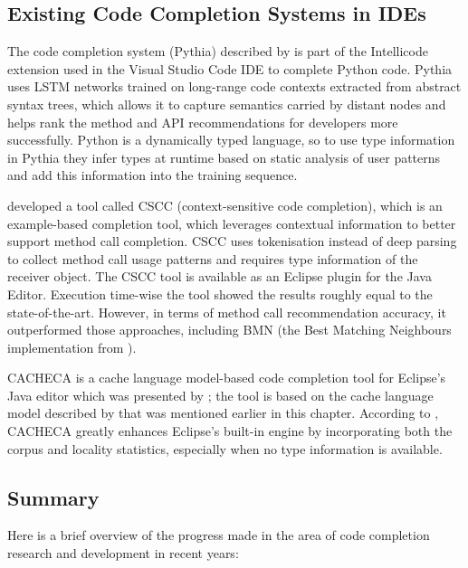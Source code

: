 \documentclass[sigplan,screen]{acmart}
\begin{document}
\subsection{Existing Code Completion Systems in IDEs}
The code completion system (Pythia) described by \cite{Svya19a} is part of the Intellicode extension used in the Visual Studio Code IDE to complete Python code. Pythia uses LSTM networks trained on long-range code contexts extracted from abstract syntax trees, which allows it to capture semantics carried by distant nodes and helps rank the method and API recommendations for developers more successfully. Python is a dynamically typed language, so to use type information in Pythia they infer types at runtime based on static analysis of user patterns and add this information into the training sequence.

\cite{Asad14a} developed a tool called CSCC (context-sensitive code completion), which is an example-based completion tool, which leverages contextual information to better support method call completion. CSCC uses tokenisation instead of deep parsing to collect method call usage patterns and requires type information of the receiver object. The CSCC tool is available as an Eclipse plugin for the Java Editor. Execution time-wise the tool showed the results roughly equal to the state-of-the-art. However, in terms of method call recommendation accuracy, it outperformed those approaches, including BMN (the Best Matching Neighbours implementation from \cite{Bruc09a}).

CACHECA is a cache language model-based code completion tool for Eclipse's Java editor which was presented by \cite{Fran15a}; the tool is based on the cache language model described by \cite{Tu14a} that was mentioned earlier in this chapter. According to \cite{Fran15a}, CACHECA greatly enhances Eclipse's built-in engine by incorporating both the corpus and locality statistics, especially when no type information is available.

\subsection{Summary}
Here is a brief overview of the progress made in the area of code completion research and development in recent years:
\end{document}
